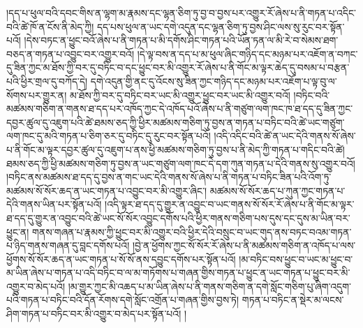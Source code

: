 །དད་པ་ཕུལ་བའི་དབང་གིས་ན་ལྷག་མ་རྣམས་དང་ལྷན་ཅིག་ཏུ་བྱ་བ་བྱས་པར་འགྱུར་རོ་ཞེས་པ་ནི་གཏན་པ་འདིང་བའི་ཚེ་ཁོ་ན་ངོས་ནི་མེད་ཀྱི། དད་པས་ཕུལ་ན་ཡང་དགེ་འདུན་དང་ལྷན་ཅིག་ཏུ་བྱས་ཤིང་ལས་སུ་རུང་བར་སྟོན་པའོ། །དེས་བཏང་ན་ཕྱུང་བའོ་ཞེས་པ་ནི་གཏན་པ་མི་དགོས་ཤིང་གཏན་པའི་ཡོན་ཏན་ལ་མི་རེ་བ་སེམས་ཐག་བཅད་ན་གཏན་པ་འབྱུང་བར་འགྱུར་བའོ། །དེ་ལྟ་བས་ན་དད་པ་མ་ཕུལ་ཞིང་གཉིད་དང་མཉམ་པར་འཇོག་ན་བཀང་དུ་ཟིན་ཀྱང་མ་ཐོས་ཀྱི་བར་དུ་བཏིང་བ་དང་ཕྱུང་བར་མི་འགྱུར་རོ་ཞེས་པ་ནི་གོང་མ་ལྟར་ཆེད་དུ་བསམ་པ་བརྩན་པའི་ཕྱིར་གྲལ་དུ་བཀོད་དེ། དགེ་འདུན་གྱི་ནང་དུ་འོངས་སུ་ཟིན་ཀྱང་གཉིད་དང་མཉམ་པར་འཇོག་པ་ལྟ་བུ་ལ་སོགས་པར་གྱུར་ན། མ་ཐོས་ཀྱི་བར་དུ་བཏིང་བར་ཡང་མི་འགྱུར་ཕྱུང་བར་ཡང་མི་འགྱུར་བའོ། །བཏིང་བའི་མཚམས་གཅིག་ན་གནས་ཐ་དད་པར་འཁོད་ཀྱང་དེ་འཁོད་པའོ་ཞེས་པ་ནི་གཙུག་ལག་ཁང་ཁ་ཐ་དད་དུ་ཟིན་ཀྱང་དབྱར་ཚུལ་དུ་འཇུག་པའི་ཚེ་ཐམས་ཅད་ཀྱི་ཕྱིར་མཚམས་གཅིག་ཏུ་བྱས་ན་གཏན་པ་བཏིང་བའི་ཚེ་ཡང་གཙུག་ལག་ཁང་དུ་མའི་གཏན་པ་ཅིག་ཅར་དུ་བཏིང་དུ་རུང་བར་སྟོན་པའོ། །འདི་འདིང་བའི་ཚེ་ན་ཡང་དེའི་གནས་སོ་ཞེས་པ་ནི་གོང་མ་ལྟར་དབྱར་ཚུལ་དུ་འཇུག་པ་ནས་ཕྱི་མཚམས་གཅིག་ཏུ་བྱས་པ་ནི་མེད་ཀྱི་གཏན་པ་གདིང་བའི་ཚེ། ཐམས་ཅད་ཀྱི་ཕྱི་མཚམས་གཅིག་ཏུ་བྱས་ན་ཡང་གཙུག་ལག་ཁང་དེ་དག་ཀུན་གཏན་པ་དེའི་གནས་སུ་འགྱུར་བའོ། །བཏིང་ནས་མཚམས་ཐ་དད་དུ་བྱས་ན་གང་ཡང་དེའི་གནས་སོ་ཞེས་པ་ནི་གཏན་པ་བཏིང་ཟིན་པའི་འོག་ཏུ་མཚམས་སོ་སོར་ཆད་ན་ཡང་གཏན་པ་འབྱུང་བར་མི་འགྱུར་ཞིང་། མཚམས་སོ་སོར་ཆད་པ་ཀུན་ཀྱང་གཏན་པ་དེའི་གནས་ཡིན་པར་སྟོན་པའོ། །འདི་ལྟར་ཐ་དད་དུ་གྱུར་ན་འབྱུང་བ་ཡང་གནས་སོ་སོར་རོ་ཞེས་པ་ནི་གོང་མ་ལྟར་ཐ་དད་དུ་གྱུར་ན་འབྱུང་བའི་ཚེ་ཡང་སོ་སོར་འབྱུང་དགོས་པའི་ཕྱིར་གནས་གཅིག་པས་དུས་དང་དུས་མ་ཡིན་བར་ཕྱུང་ན། གནས་གཞན་པ་རྣམས་ཀྱི་ཕྱུང་བར་མི་འགྱུར་བའི་ཕྱིར་དེའི་བསྲུང་བ་ཡང་གུད་ནས་བཏང་བའམ་གཏན་པ་ཉིད་གནས་གཞན་དུ་བླང་དགོས་པའོ། །བྱེ་ན་ཕྱོགས་ཀྱང་སོ་སོར་རོ་ཞེས་པ་ནི་མཚམས་གཅིག་ན་འཁོད་པ་ལས་ཕྱོགས་སོ་སོར་ཆད་ན་ཡང་གཏན་པ་སོ་སོ་ནས་དབྱུང་དགོས་པར་སྟོན་པའོ། །མ་བཏིང་བས་ཕྱུང་བ་ཡང་མ་ཕྱུང་བ་མ་ཡིན་ཞེས་པ་གཏན་པ་འདི་བཏིང་བ་ལ་མ་གཏོགས་པ་གཞན་གྱིས་གཏན་པ་ཕྱུང་ན་ཡང་གཏན་པ་ཕྱུང་བར་མི་འགྱུར་བ་མེད་པའོ། །མ་གྱུར་ཀྱང་མི་འཆད་པ་མ་ཡིན་ཞེས་པ་ནི་གནས་གཅིག་ན་དགེ་སློང་གཅིག་པུ་ཞིག་འདུག་པའི་གཏན་པ་བཏིང་བའི་དོན་རོགས་དགེ་སློང་འགྲོན་པ་གཞན་གྱིས་བྱས་ཏེ། གཏན་པ་བཏིང་ན་སྡེར་མ་ལངས་ཤིག་གཏན་པ་བཏིང་བར་མི་འགྱུར་བ་མེད་པར་སྟོན་པའོ། །
